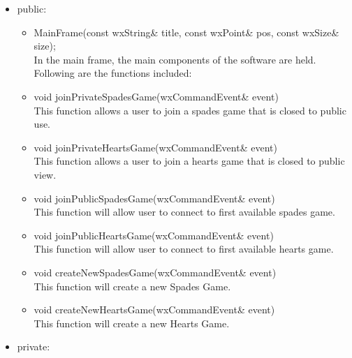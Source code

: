 \documentclass[]{scrartcl}
\begin{document}
	\begin{itemize}
		\item public:

		\begin{itemize}
			\item MainFrame(const wxString\& title, const wxPoint\& pos, const wxSize\& size);
				\\ In the main frame, the main components of the software are held. Following are the functions included:

			\item void joinPrivateSpadesGame(wxCommandEvent\& event) {}
				\\This function allows a user to join a spades game that is closed to public use.

			\item void joinPrivateHeartsGame(wxCommandEvent\& event) {}
				\\ This function allows a user to join a hearts game that is closed to public view.

			\item void joinPublicSpadesGame(wxCommandEvent\& event) {}
				\\ This function will allow user to connect to first available spades game.

			\item void joinPublicHeartsGame(wxCommandEvent\& event) {}
				\\ This function will allow user to connect to first available hearts game.

			\item void createNewSpadesGame(wxCommandEvent\& event) {}
				\\	This function will create a new Spades Game.

			\item void createNewHeartsGame(wxCommandEvent\& event) {}
				\\ This function will create a new Hearts Game.

		\end{itemize}

		\item 	private:


\end{itemize}
\end{document}
